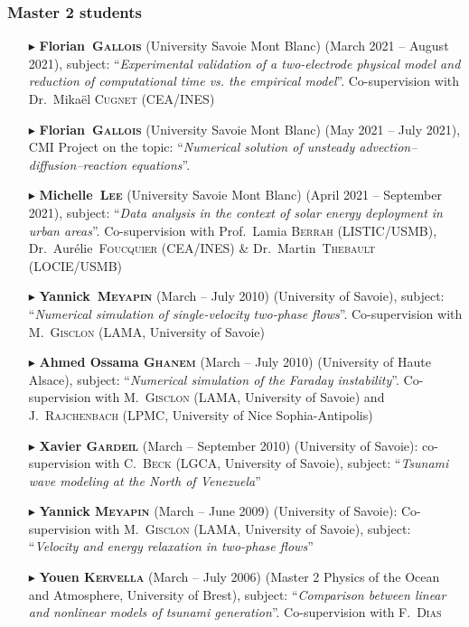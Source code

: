         \separator
        \subsubsection{Master 2 students}
        \begin{itemize}
            \item[$\blacktriangleright$] \textbf{Florian~\textsc{Gallois}} (University Savoie Mont Blanc) (March 2021 -- August 2021), subject: ``\textit{Experimental validation of a two-electrode physical model and reduction of computational time vs. the empirical model}''. Co-supervision with Dr.~Mika\"el \textsc{Cugnet} (CEA/INES)
            \item[$\blacktriangleright$] \textbf{Florian~\textsc{Gallois}} (University Savoie Mont Blanc) (May 2021 -- July 2021), CMI Project on the topic: ``\textit{Numerical solution of unsteady advection--diffusion--reaction equations}''.
            \item[$\blacktriangleright$] \textbf{Michelle~\textsc{Lee}} (University Savoie Mont Blanc) (April 2021 -- September 2021), subject: ``\textit{Data analysis in the context of solar energy deployment in urban areas}''. Co-supervision with Prof.~Lamia \textsc{Berrah} (LISTIC/USMB), Dr.~Aur\'elie~\textsc{Foucquier} (CEA/INES) \& Dr.~Martin~\textsc{Thebault} (LOCIE/USMB)
            \item[$\blacktriangleright$] \textbf{Yannick~\textsc{Meyapin}} (March -- July 2010) (University of Savoie), subject: ``\textit{Numerical simulation of single-velocity two-phase flows}''. Co-supervision with M.~\textsc{Gisclon} (LAMA, University of Savoie)
            \item[$\blacktriangleright$] \textbf{Ahmed Ossama \textsc{Ghanem}} (March -- July 2010) (University of Haute Alsace), subject: ``\textit{Numerical simulation of the Faraday instability}''. Co-supervision with M.~\textsc{Gisclon} (LAMA, University of Savoie) and J.~\textsc{Rajchenbach} (LPMC, University of Nice Sophia-Antipolis)
            \item[$\blacktriangleright$] \textbf{Xavier \textsc{Gardeil}} (March -- September 2010) (University of Savoie): co-supervision with C.~\textsc{Beck} (LGCA, University of Savoie), subject: ``\textit{Tsunami wave modeling at the North of Venezuela}''
            \item[$\blacktriangleright$] \textbf{Yannick \textsc{Meyapin}} (March -- June 2009) (University of Savoie): Co-supervision with M.~\textsc{Gisclon} (LAMA, University of Savoie), subject: ``\textit{Velocity and energy relaxation in two-phase flows}''
            \item[$\blacktriangleright$] \textbf{Youen \textsc{Kervella}} (March -- July 2006) (Master 2 Physics of the Ocean and Atmosphere, University of Brest), subject: ``\textit{Comparison between linear and nonlinear models of tsunami generation}''. Co-supervision with F.~\textsc{Dias}
        \end{itemize}

